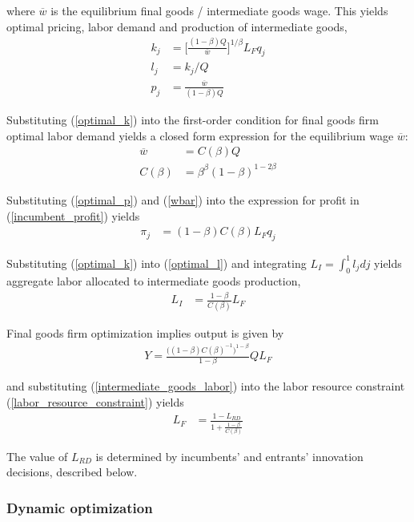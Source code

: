 \documentclass[12pt,english]{article}
\theoremstyle{remark}
\begin{document}
where $\overline{w}$ is the equilibrium final goods / intermediate goods wage.
This yields optimal pricing, labor demand and production of intermediate goods,
\begin{align}
k_j &= \Big[ \frac{(1-\beta) Q}{\overline{w}} \Big]^{1/\beta}L_F q_j  \label{optimal_k}\\
l_j &= k_j / Q \label{optimal_l}\\
p_j &= \frac{\overline{w}}{(1-\beta) Q} \label{optimal_p}
\end{align}

Substituting (\ref{optimal_k}) into the first-order condition for final goods firm optimal labor demand yields a closed form expression for the equilibrium wage $\overline{w}$:
\begin{align}
\overline{w} &= C(\beta) Q \label{wbar} \\
C(\beta) &= \beta^{\beta} (1-\beta)^{1-2\beta} \label{def_cbeta}
\end{align}

Substituting (\ref{optimal_p}) and (\ref{wbar}) into the expression for profit in (\ref{incumbent_profit}) yields
\begin{align}
\pi_j &= (1-\beta) C(\beta) L_F q_j \label{profits_eq}
\end{align}

Substituting (\ref{optimal_k}) into (\ref{optimal_l}) and integrating $L_I = \int_0^1 l_j dj$ yields aggregate labor allocated to intermediate goods production,
\begin{align}
L_I &= \frac{1-\beta}{C(\beta)}L_F \label{intermediate_goods_labor}
\end{align}

Final goods firm optimization implies output is given by 
\begin{align}
Y = \frac{\Big((1-\beta)C(\beta)^{-1}\Big)^{1-\beta}}{1-\beta} Q L_F \label{output_eq}
\end{align}

and substituting (\ref{intermediate_goods_labor}) into the labor resource constraint (\ref{labor_resource_constraint}) yields
\begin{align}
L_F &= \frac{1 - L_{RD}}{1 + \frac{1-\beta}{C(\beta)}}
\end{align}

The value of $L_{RD}$ is determined by incumbents' and entrants' innovation decisions, described below.



\subsubsection{Dynamic optimization}
\end{document}
